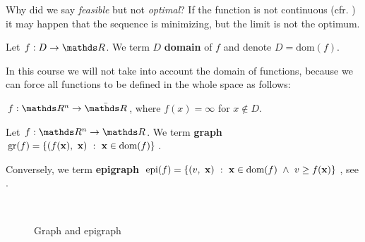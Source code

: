 \documentclass[computationalMathematics.tex]{subfiles}
\begin{document}
Why did we say \emph{feasible} but not \emph{optimal}? If the function is not continuous (cfr. ) it may happen that the sequence is minimizing, but the limit is not the optimum.


\begin{definition}[Domain]
Let $f : D \to \R$. We term $D$ \textbf{domain} of $f$ and denote $D = \text{dom}(f)$.
\end{definition}

\noindent In this course we will not take into account the domain of functions, because we can force all functions to be defined in the whole space as follows:

$f : \R^n \to \bar{\R}$, where $f(x) = \infty$ for $x \notin D$.

\begin{definition}
  Let $f: \R^n \to \R$. We term \textbf{graph} $\text{gr}(f) = \{(f({\bf x }),~{\bf x })~:~{\bf x } \in \text{dom}(f)\}$.

  Conversely, we term \textbf{epigraph} $\text{epi}(f) = \{(v,~{\bf x })~:~{\bf x } \in \text{dom}(f)~\wedge~v \geq f({\bf x })\}$, see .
\end{definition}

\begin{figure}[htb]
	\centering
	\hspace{0.5cm}
	\\
	\caption{Graph and epigraph}
	\label{fig:27sett1}
\end{figure}
\end{document}

